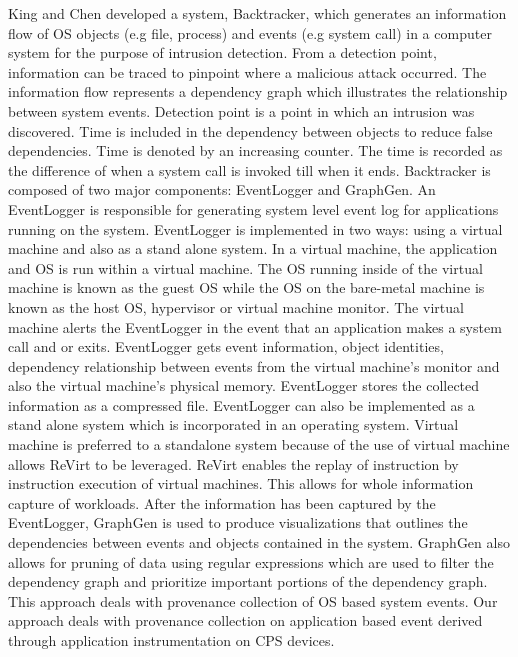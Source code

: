 King and Chen \cite{King:2003:BI:945445.945467} developed a system, Backtracker, which generates an information flow of OS objects (e.g file, process) and events (e.g system call) in a computer system for the purpose of intrusion detection. From a detection point, information can be traced to pinpoint where a malicious attack occurred. The information flow represents a dependency graph which illustrates the relationship between system events. Detection point is a point in which an intrusion was discovered. Time is included in the dependency between objects to reduce false dependencies. Time is denoted by an increasing counter. The time is recorded as the difference of when a system call is invoked till when it ends. Backtracker is composed of two major components: EventLogger and GraphGen. An EventLogger is responsible for generating system level event log for applications running on the system. EventLogger is implemented in two ways: using a virtual machine and also as a stand alone system. In a virtual machine, the application and OS is run within a virtual machine. The OS running inside of the virtual machine is known as the guest OS while the OS on the bare-metal machine is known as the host OS, hypervisor or virtual machine monitor. The virtual machine alerts the EventLogger in the event that an application makes a system call and or exits. EventLogger gets event information, object identities, dependency relationship between events from the virtual machine's monitor and also the virtual machine's physical memory. EventLogger stores the collected information as a compressed file. EventLogger can also be implemented as a stand alone system which is incorporated in an operating system. Virtual machine is preferred to a standalone system because of the use of virtual machine allows ReVirt to be leveraged. ReVirt enables the replay of instruction by instruction execution of virtual machines. This allows for whole information capture of workloads. After the information has been captured by the EventLogger, GraphGen is used to produce visualizations that outlines the dependencies between events and objects contained in the system. GraphGen also allows for pruning of data using regular expressions which are used to filter the dependency graph and prioritize important portions of the dependency graph. This approach deals with provenance collection of OS based system events. Our approach deals with provenance collection on application based event derived through application instrumentation on CPS devices.





